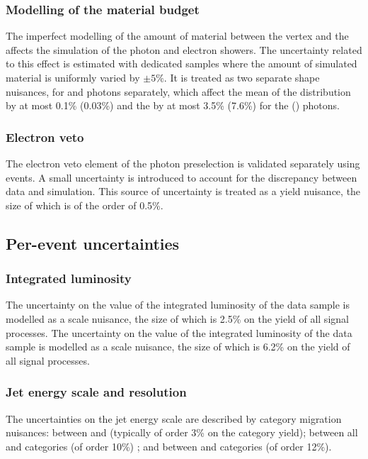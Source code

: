 \subsubsection{Modelling of the material budget}
The imperfect modelling of the amount of material between the vertex and the \ECAL affects the simulation of the photon and electron showers. The uncertainty related to this effect is estimated with dedicated samples where the amount of simulated material is uniformly varied by $\pm 5\%$. It is treated as two separate shape nuisances, for \EB and \EE photons separately, which affect the mean of the \mgg distribution by at most 0.1\% (0.03\%) and the \effSigma by at most 3.5\% (7.6\%) for the \EB (\EE) photons.

\subsubsection{Electron veto}
The electron veto element of the photon preselection is validated separately using \Zmmg events. A small uncertainty is introduced to account for the discrepancy between data and simulation. This source of uncertainty is treated as a yield nuisance, the size of which is of the order of 0.5\%. 

\subsection{Per-event uncertainties}

\subsubsection{Integrated luminosity}
\ifNewAnalysis
The uncertainty on the value of the integrated luminosity of the data sample is modelled as a scale nuisance, the size of which is 2.5\% on the yield of all signal processes. 
\else
The uncertainty on the value of the integrated luminosity of the data sample is modelled as a scale nuisance, the size of which is 6.2\% on the yield of all signal processes. 
\fi

\subsubsection{Jet energy scale and resolution}
The uncertainties on the jet energy scale are described by category migration nuisances: between  and  (typically of order 3\% on the category yield); between all \VBF and \Untagged categories (of order 10\%) ; and between \TTHTag and \Untagged categories (of order 12\%).

